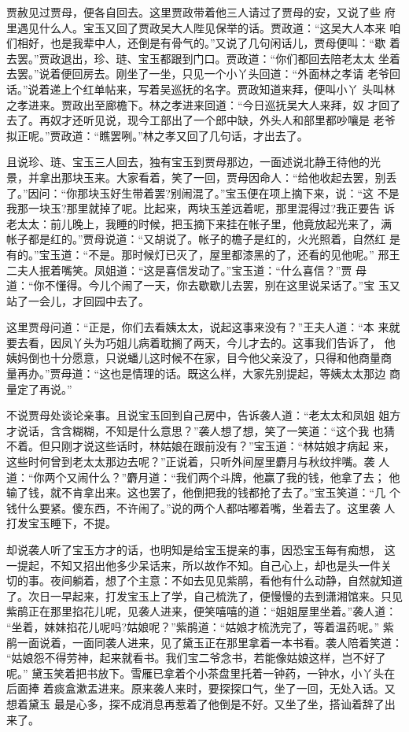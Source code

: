 贾赦见过贾母，便各自回去。这里贾政带着他三人请过了贾母的安，又说了些
府里遇见什么人。宝玉又回了贾政吴大人陛见保举的话。贾政道：“这吴大人本来
咱们相好，也是我辈中人，还倒是有骨气的。”又说了几句闲话儿，贾母便叫：“歇
着去罢。”贾政退出，珍、琏、宝玉都跟到门口。贾政道：“你们都回去陪老太太
坐着去罢。”说着便回房去。刚坐了一坐，只见一个小丫头回道：“外面林之孝请
老爷回话。”说着递上个红单帖来，写着吴巡抚的名字。贾政知道来拜，便叫小丫
头叫林之孝进来。贾政出至廊檐下。林之孝进来回道：“今日巡抚吴大人来拜，奴
才回了去了。再奴才还听见说，现今工部出了一个郎中缺，外头人和部里都吵嚷是
老爷拟正呢。”贾政道：“瞧罢咧。”林之孝又回了几句话，才出去了。

且说珍、琏、宝玉三人回去，独有宝玉到贾母那边，一面述说北静王待他的光
景，并拿出那块玉来。大家看着，笑了一回，贾母因命人：“给他收起去罢，别丢
了。”因问：“你那块玉好生带着罢?别闹混了。”宝玉便在项上摘下来，说：“这
不是我那一块玉?那里就掉了呢。比起来，两块玉差远着呢，那里混得过?我正要告
诉老太太：前儿晚上，我睡的时候，把玉摘下来挂在帐子里，他竟放起光来了，满
帐子都是红的。”贾母说道：“又胡说了。帐子的檐子是红的，火光照着，自然红
是有的。”宝玉道：“不是。那时候灯已灭了，屋里都漆黑的了，还看的见他呢。”
邢王二夫人抿着嘴笑。凤姐道：“这是喜信发动了。”宝玉道：“什么喜信？”贾
母道：“你不懂得。今儿个闹了一天，你去歇歇儿去罢，别在这里说呆话了。”宝
玉又站了一会儿，才回园中去了。

这里贾母问道：“正是，你们去看姨太太，说起这事来没有？”王夫人道：“本
来就要去看，因凤丫头为巧姐儿病着耽搁了两天，今儿才去的。这事我们告诉了，
他姨妈倒也十分愿意，只说蟠儿这时候不在家，目今他父亲没了，只得和他商量商
量再办。”贾母道：“这也是情理的话。既这么样，大家先别提起，等姨太太那边
商量定了再说。”

不说贾母处谈论亲事。且说宝玉回到自己房中，告诉袭人道：“老太太和凤姐
姐方才说话，含含糊糊，不知是什么意思？”袭人想了想，笑了一笑道：“这个我
也猜不着。但只刚才说这些话时，林姑娘在跟前没有？”宝玉道：“林姑娘才病起
来，这些时何曾到老太太那边去呢？”正说着，只听外间屋里麝月与秋纹拌嘴。袭
人道：“你两个又闹什么？”麝月道：“我们两个斗牌，他赢了我的钱，他拿了去；
他输了钱，就不肯拿出来。这也罢了，他倒把我的钱都抢了去了。”宝玉笑道：“几
个钱什么要紧。傻东西，不许闹了。”说的两个人都咕嘟着嘴，坐着去了。这里袭
人打发宝玉睡下，不提。

却说袭人听了宝玉方才的话，也明知是给宝玉提亲的事，因恐宝玉每有痴想，
这一提起，不知又招出他多少呆话来，所以故作不知。自己心上，却也是头一件关
切的事。夜间躺着，想了个主意：不如去见见紫鹃，看他有什么动静，自然就知道
了。次日一早起来，打发宝玉上了学，自己梳洗了，便慢慢的去到潇湘馆来。只见
紫鹃正在那里掐花儿呢，见袭人进来，便笑嘻嘻的道：“姐姐屋里坐着。”袭人道：
“坐着，妹妹掐花儿呢吗?姑娘呢？”紫鹃道：“姑娘才梳洗完了，等着温药呢。”
紫鹃一面说着，一面同袭人进来，见了黛玉正在那里拿着一本书看。袭人陪着笑道：
“姑娘怨不得劳神，起来就看书。我们宝二爷念书，若能像姑娘这样，岂不好了呢。”
黛玉笑着把书放下。雪雁已拿着个小茶盘里托着一钟药，一钟水，小丫头在后面捧
着痰盒漱盂进来。原来袭人来时，要探探口气，坐了一回，无处入话。又想着黛玉
最是心多，探不成消息再惹着了他倒是不好。又坐了坐，搭讪着辞了出来了。

